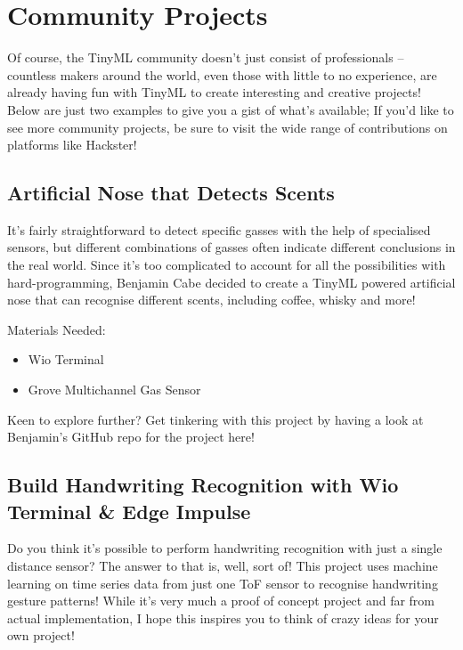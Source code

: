\chapter{Community Projects}

Of course, the TinyML community doesn’t just consist of professionals – countless makers around the world, even those with little to no experience, are already having fun with TinyML to create interesting and creative projects! Below are just two examples to give you a gist of what’s available; If you’d like to see more community projects, be sure to visit the wide range of contributions on platforms like Hackster!

\section{Artificial Nose that Detects Scents}

It’s fairly straightforward to detect specific gasses with the help of specialised sensors, but different combinations of gasses often indicate different conclusions in the real world. Since it’s too complicated to account for all the possibilities with hard-programming, Benjamin Cabe decided to create a TinyML powered artificial nose that can recognise different scents, including coffee, whisky and more!


\bigskip

Materials Needed:

\begin{itemize}
  \item Wio Terminal
  \item Grove Multichannel Gas Sensor
\end{itemize}

Keen to explore further? Get tinkering with this project by having a look at Benjamin’s GitHub repo for the project here!

\section{Build Handwriting Recognition with Wio Terminal \& Edge Impulse}

Do you think it’s possible to perform handwriting recognition with just a single distance sensor? The answer to that is, well, sort of! This project uses machine learning on time series data from just one ToF sensor to recognise handwriting gesture patterns! While it’s very much a proof of concept project and far from actual implementation, I hope this inspires you to think of crazy ideas for your own project!

